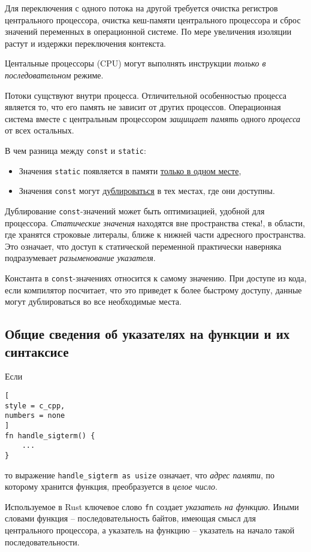 \documentclass[%
	11pt,
	a4paper,
	utf8,
		]{article}
\begin{document}
Для переключения с одного потока на другой требуется очистка регистров центрального процессора, очистка кеш-памяти центрального процессора и сброс значений переменных в операционной системе. По мере увеличения изоляции растут и издержки переключения контекста.

Центальные процессоры (CPU) могут выполнять инструкции \emph{только в последовательном}  режиме.

Потоки сущствуют внутри процесса. Отличительной особенностью процесса является то, что его память не зависит от других процессов. Операционная система вместе с центральным процессором \emph{защищает память} одного \emph{процесса} от всех остальных.

{В чем разница между \texttt{const} и \texttt{static}}:
\begin{itemize}
	\item Значения \verb|static| появляется в памяти \underline{только в одном месте},
	
	\item Значения \verb|const| могут \underline{дублироваться} в тех местах, где они доступны.
\end{itemize}

Дублирование \verb|const|-значений может быть оптимизацией, удобной для процессора. \emph{Статические значения} находятся {\color{red}вне пространства стека!}, в области, где хранятся строковые литералы, ближе к нижней части адресного пространства. Это означает, что доступ к статической переменной практически наверняка подразумевает \emph{разыменование указателя}.

Константа в \verb|const|-значениях относится к самому значению. При доступе из кода, если компилятор посчитает, что это приведет к более быстрому доступу, данные могут дублироваться во все необходимые места.

\subsection{Общие сведения об указателях на функции и их синтаксисе}

Если
\begin{lstlisting}[
style = c_cpp,
numbers = none
]
fn handle_sigterm() {
    ...
}
\end{lstlisting}
то выражение \verb|handle_sigterm as usize| означает, что \emph{адрес памяти}, по которому хранится функция, преобразуется в \emph{целое число}.

Используемое в Rust ключевое слово \verb|fn| создает \emph{указатель на функцию}. Иными словами функция -- последовательность байтов, имеющая смысл для центрального процессора, а указатель на функцию -- указатель на начало такой последовательности.
\end{document}
